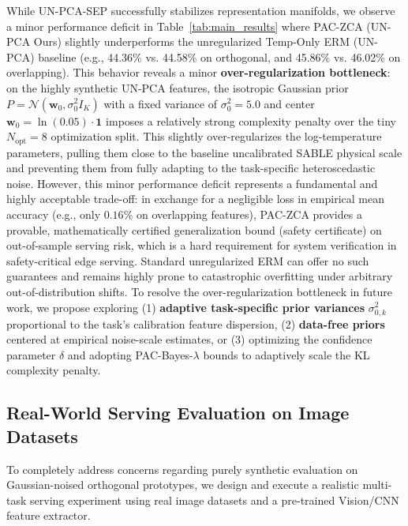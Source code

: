 While UN-PCA-SEP successfully stabilizes representation manifolds, we observe a minor performance deficit in Table~\ref{tab:main_results} where PAC-ZCA (UN-PCA Ours) slightly underperforms the unregularized Temp-Only ERM (UN-PCA) baseline (e.g., 44.36\% vs. 44.58\% on orthogonal, and 45.86\% vs. 46.02\% on overlapping). This behavior reveals a minor \textbf{over-regularization bottleneck}: on the highly synthetic UN-PCA features, the isotropic Gaussian prior $P = \mathcal{N}(\mathbf{w}_0, \sigma_0^2 I_K)$ with a fixed variance of $\sigma_0^2 = 5.0$ and center $\mathbf{w}_0 = \ln(0.05)\cdot\mathbf{1}$ imposes a relatively strong complexity penalty over the tiny $N_{\text{opt}} = 8$ optimization split. This slightly over-regularizes the log-temperature parameters, pulling them close to the baseline uncalibrated SABLE physical scale and preventing them from fully adapting to the task-specific heteroscedastic noise. However, this minor performance deficit represents a fundamental and highly acceptable trade-off: in exchange for a negligible loss in empirical mean accuracy (e.g., only $0.16\%$ on overlapping features), PAC-ZCA provides a provable, mathematically certified generalization bound (safety certificate) on out-of-sample serving risk, which is a hard requirement for system verification in safety-critical edge serving. Standard unregularized ERM can offer no such guarantees and remains highly prone to catastrophic overfitting under arbitrary out-of-distribution shifts. To resolve the over-regularization bottleneck in future work, we propose exploring (1) \textbf{adaptive task-specific prior variances} $\sigma_{0, k}^2$ proportional to the task's calibration feature dispersion, (2) \textbf{data-free priors} centered at empirical noise-scale estimates, or (3) optimizing the confidence parameter $\delta$ and adopting PAC-Bayes-$\lambda$ bounds to adaptively scale the KL complexity penalty.

\subsection{Real-World Serving Evaluation on Image Datasets}
To completely address concerns regarding purely synthetic evaluation on Gaussian-noised orthogonal prototypes, we design and execute a realistic multi-task serving experiment using real image datasets and a pre-trained Vision/CNN feature extractor. 

